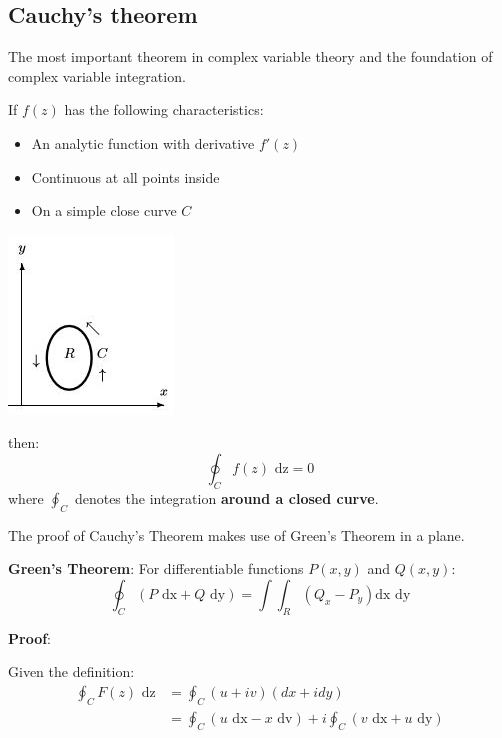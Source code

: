 \documentclass[10pt,a4paper]{article}
\begin{document}
\subsection{Cauchy's theorem}

The most important theorem in complex variable theory and the foundation of complex variable
integration. \par 

\begin{tcolorbox}[breakable,colback=white]
If $f(z)$ has the following characteristics:
\begin{itemize}
    \item An analytic function with derivative $f'(z)$ 
    \item Continuous at all points inside 
    \item On a simple close curve $C$
\end{itemize}
\begin{center}
    \includegraphics[scale=0.7]{Cauchy.JPG}
\end{center}
then: 
$$
\oint_C f(z) \text{ dz} = 0
$$
where $\oint_C$ denotes the integration \textbf{around a closed curve}.
\end{tcolorbox}

The proof of Cauchy's Theorem makes use of Green's Theorem in a plane. 

\begin{tcolorbox}[breakable,colback=white]
\textbf{Green's Theorem}: For differentiable functions $P(x,y)$ and $Q(x,y)$:
$$
\oint_C (P\text{ dx}+Q\text{ dy})=\int \int_R(Q_x - P_y) \text{dx dy}
$$ 
\end{tcolorbox}

\textbf{Proof}: \par 
Given the definition:
\begin{equation*} 
    \begin{aligned}
        \oint_C F(z)\text{ dz} &= \oint_C (u+iv)(dx +idy) \\
        &= \oint_C (u\text{ dx}-x\text{ dv})+ i\oint_C (v\text{ dx}+u\text{ dy})
    \end{aligned}
\end{equation*}
\end{document}
